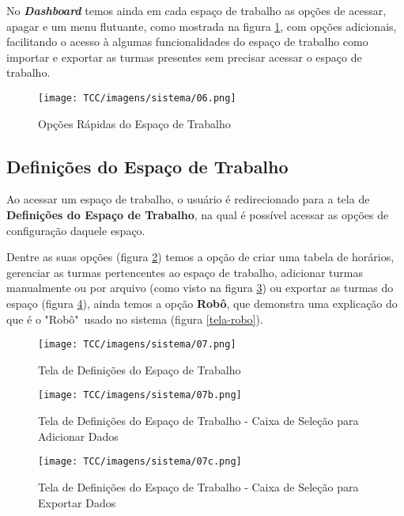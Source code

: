 \begin{anexosenv}
No \textbf{\textit{Dashboard}} temos ainda em cada espaço de trabalho as opções de acessar, apagar e um menu flutuante, como mostrada na figura \ref{tela-opcoes-rapidas}, com opções adicionais, facilitando o acesso à algumas funcionalidades do espaço de trabalho como importar e exportar as turmas presentes sem precisar acessar o espaço de trabalho.

\begin{figure}[H]
     \centering
     \texttt{[image: TCC/imagens/sistema/06.png]}
     \caption{Opções Rápidas do Espaço de Trabalho}
     \label{tela-opcoes-rapidas}
\end{figure}

\subsection{Definições do Espaço de Trabalho}

Ao acessar um espaço de trabalho, o usuário é redirecionado para a tela de \textbf{Definições do Espaço de Trabalho}, na qual é possível acessar as opções de configuração daquele espaço.

Dentre as suas opções (figura \ref{tela-definicoes}) temos a opção de criar uma tabela de horários, gerenciar as turmas pertencentes ao espaço de trabalho, adicionar turmas manualmente ou por arquivo (como visto na figura \ref{tela-definicoes-2}) ou exportar as turmas do espaço (figura \ref{tela-definicoes-3}), ainda temos a opção \textbf{Robô}, que demonstra uma explicação do que é o "Robô"\ usado no sistema (figura \ref{tela-robo}).

\begin{figure}[H]
     \centering
     \texttt{[image: TCC/imagens/sistema/07.png]}
     \caption{Tela de Definições do Espaço de Trabalho}
     \label{tela-definicoes}
\end{figure}

\begin{figure}[H]
     \centering
     \texttt{[image: TCC/imagens/sistema/07b.png]}
     \caption{Tela de Definições do Espaço de Trabalho - Caixa de Seleção para Adicionar Dados}
     \label{tela-definicoes-2}
\end{figure}

\begin{figure}[H]
     \centering
     \texttt{[image: TCC/imagens/sistema/07c.png]}
     \caption{Tela de Definições do Espaço de Trabalho - Caixa de Seleção para Exportar Dados}
     \label{tela-definicoes-3}
\end{figure}


\end{anexosenv}
